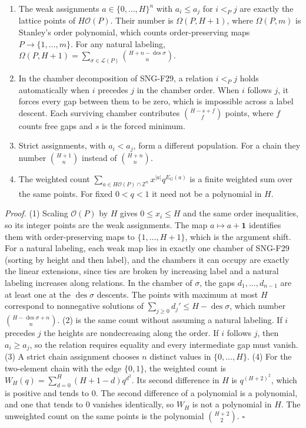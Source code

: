 \documentclass[
  11pt,
  a4paper,
]{report}
\providecommand{\tightlist}{%
  \setlength{\itemsep}{0pt}\setlength{\parskip}{0pt}}
\begin{document}
\begin{enumerate}
\def\labelenumi{\arabic{enumi}.}
\tightlist
\item
  The weak assignments \(a\in\{0,\ldots,H\}^n\) with \(a_i\le a_j\) for
  \(i<_Pj\) are exactly the lattice points of \(H\mathcal O(P)\). Their
  number is \(\Omega(P,H+1)\), where \(\Omega(P,m)\) is Stanley's order
  polynomial, which counts order-preserving maps \(P\to\{1,\ldots,m\}\).
  For any natural labeling,
  \(\Omega(P,H+1)=\sum_{\sigma\in\mathcal L(P)}\binom{H+n-\operatorname{des}\sigma}{n}\).
\item
  In the chamber decomposition of SNG-F29, a relation \(i<_Pj\) holds
  automatically when \(i\) precedes \(j\) in the chamber order. When
  \(i\) follows \(j\), it forces every gap between them to be zero,
  which is impossible across a label descent. Each surviving chamber
  contributes \(\binom{H-s+f}{f}\) points, where \(f\) counts free gaps
  and \(s\) is the forced minimum.
\item
  Strict assignments, with \(a_i<a_j\), form a different population. For
  a chain they number \(\binom{H+1}{n}\) instead of \(\binom{H+n}{n}\).
\item
  The weighted count
  \(\sum_{a\in H\mathcal O(P)\cap\mathbb Z^n}x^{|a|}q^{E_G(a)}\) is a
  finite weighted sum over the same points. For fixed \(0<q<1\) it need
  not be a polynomial in \(H\).
\end{enumerate}

\emph{Proof.} (1) Scaling \(\mathcal O(P)\) by \(H\) gives
\(0\le x_i\le H\) and the same order inequalities, so its integer points
are the weak assignments. The map \(a\mapsto a+\mathbf1\) identifies
them with order-preserving maps to \(\{1,\ldots,H+1\}\), which is the
argument shift. For a natural labeling, each weak map lies in exactly
one chamber of SNG-F29 (sorting by height and then label), and the
chambers it can occupy are exactly the linear extensions, since ties are
broken by increasing label and a natural labeling increases along
relations. In the chamber of \(\sigma\), the gaps \(d_1,\ldots,d_{n-1}\)
are at least one at the \(\operatorname{des}\sigma\) descents. The
points with maximum at most \(H\) correspond to nonnegative solutions of
\(\sum_{j\ge0}d_j'\le H-\operatorname{des}\sigma\), which number
\(\binom{H-\operatorname{des}\sigma+n}{n}\). (2) is the same count
without assuming a natural labeling. If \(i\) precedes \(j\) the heights
are nondecreasing along the order. If \(i\) follows \(j\), then
\(a_i\ge a_j\), so the relation requires equality and every intermediate
gap must vanish. (3) A strict chain assignment chooses \(n\) distinct
values in \(\{0,\ldots,H\}\). (4) For the two-element chain with the
edge \(\{0,1\}\), the weighted count is
\(W_H(q)=\sum_{d=0}^H(H+1-d)q^{d^2}\). Its second difference in \(H\) is
\(q^{(H+2)^2}\), which is positive and tends to \(0\). The second
difference of a polynomial is a polynomial, and one that tends to \(0\)
vanishes identically, so \(W_H\) is not a polynomial in \(H\). The
unweighted count on the same points is the polynomial \(\binom{H+2}2\).
\(\square\)
\end{document}
